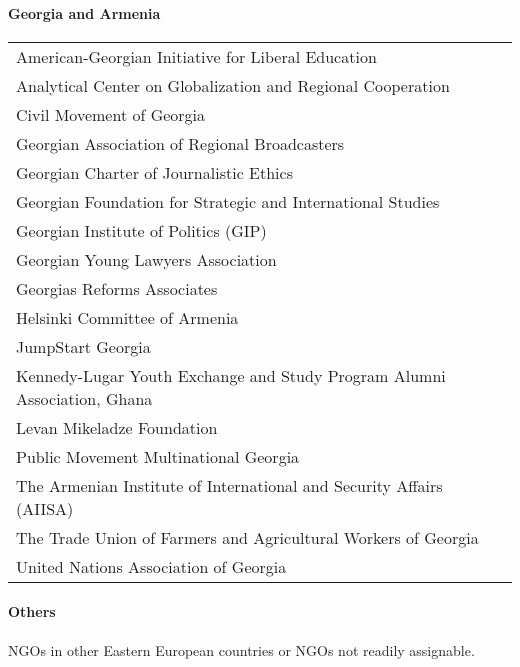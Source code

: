 \hypertarget{georgia-and-armenia}{%
\paragraph{Georgia and Armenia}\label{georgia-and-armenia}}

\begin{longtable}[]{@{}l@{}}
\toprule
\endhead
American-Georgian Initiative for Liberal Education\tabularnewline
Analytical Center on Globalization and Regional
Cooperation\tabularnewline
Civil Movement of Georgia\tabularnewline
Georgian Association of Regional Broadcasters\tabularnewline
Georgian Charter of Journalistic Ethics\tabularnewline
Georgian Foundation for Strategic and International
Studies\tabularnewline
Georgian Institute of Politics (GIP)\tabularnewline
Georgian Young Lawyers Association\tabularnewline
Georgias Reforms Associates\tabularnewline
Helsinki Committee of Armenia\tabularnewline
JumpStart Georgia\tabularnewline
Kennedy-Lugar Youth Exchange and Study Program Alumni Association,
Ghana\tabularnewline
Levan Mikeladze Foundation\tabularnewline
Public Movement Multinational Georgia\tabularnewline
The Armenian Institute of International and Security Affairs
(AIISA)\tabularnewline
The Trade Union of Farmers and Agricultural Workers of
Georgia\tabularnewline
United Nations Association of Georgia\tabularnewline
\bottomrule
\end{longtable}

\hypertarget{others}{%
\paragraph{Others}\label{others}}

NGOs in other Eastern European countries or NGOs not readily assignable.

